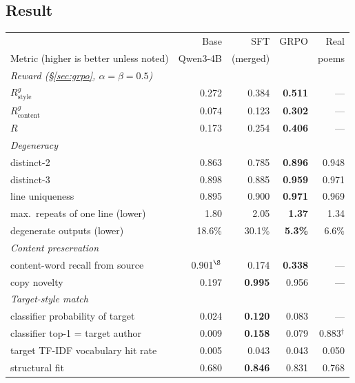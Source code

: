 \documentclass[11pt]{article}
\begin{document}
\subsection{Result}

\begin{center}
\begin{tabular}{lrrrr}
\toprule
& Base & SFT & GRPO & Real \\
Metric (higher is better unless noted) & Qwen3-4B & (merged) & & poems \\
\midrule
\multicolumn{5}{l}{\emph{Reward (\S\ref{sec:grpo}, $\alpha=\beta=0.5$)}} \\
\quad $R_{\mathrm{style}}^{g}$              & 0.272 & 0.384 & \textbf{0.511} & --- \\
\quad $R_{\mathrm{content}}^{g}$            & 0.074 & 0.123 & \textbf{0.302} & --- \\
\quad $R$                                   & 0.173 & 0.254 & \textbf{0.406} & --- \\
\midrule
\multicolumn{5}{l}{\emph{Degeneracy}} \\
\quad distinct-2                            & 0.863 & 0.785 & \textbf{0.896} & 0.948 \\
\quad distinct-3                            & 0.898 & 0.885 & \textbf{0.959} & 0.971 \\
\quad line uniqueness                       & 0.895 & 0.900 & \textbf{0.971} & 0.969 \\
\quad max.\ repeats of one line (lower)     & 1.80  & 2.05  & \textbf{1.37}  & 1.34 \\
\quad degenerate outputs (lower)            & 18.6\% & 30.1\% & \textbf{5.3\%} & 6.6\% \\
\midrule
\multicolumn{5}{l}{\emph{Content preservation}} \\
\quad content-word recall from source       & 0.901$^\S$ & 0.174 & \textbf{0.338} & --- \\
\quad copy novelty                          & 0.197 & \textbf{0.995} & 0.956 & --- \\
\midrule
\multicolumn{5}{l}{\emph{Target-style match}} \\
\quad classifier probability of target      & 0.024 & \textbf{0.120} & 0.083 & --- \\
\quad classifier top-1 = target author      & 0.009 & \textbf{0.158} & 0.079 & 0.883$^\dagger$ \\
\quad target TF-IDF vocabulary hit rate     & 0.005 & 0.043 & 0.043 & 0.050 \\
\quad structural fit                        & 0.680 & \textbf{0.846} & 0.831 & 0.768 \\
\bottomrule
\end{tabular}
\end{center}
\end{document}
